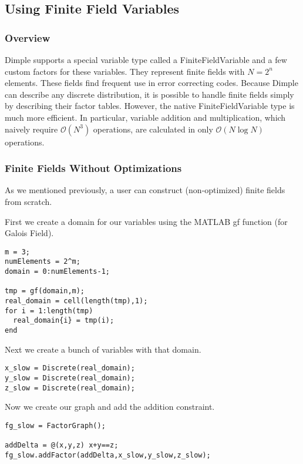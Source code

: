 \subsection{Using Finite Field Variables}
\label{sec:finiteFields}


\subsubsection{Overview}

Dimple supports a special variable type called a FiniteFieldVariable and a few custom factors for these variables. They represent finite fields with $N=2^{n}$ elements. These fields find frequent use in error correcting codes. Because Dimple can describe any discrete distribution, it is possible to handle finite fields simply by describing their factor tables. However, the native FiniteFieldVariable type is much more efficient. In particular, variable addition and multiplication, which naively require $\mathcal{O}(N^{3})$ operations, are calculated in only $\mathcal{O}(N\log N)$ operations.

\ifmatlab

\subsubsection{Finite Fields Without Optimizations}

As we mentioned previously, a user can construct (non-optimized) finite fields from scratch.

First we create a domain for our variables using the MATLAB gf function (for Galois Field).

\begin{lstlisting}
m = 3; 
numElements = 2^m;
domain = 0:numElements-1;

tmp = gf(domain,m); 
real_domain = cell(length(tmp),1);
for i = 1:length(tmp)
  real_domain{i} = tmp(i); 
end
\end{lstlisting}

Next we create a bunch of variables with that domain.

\begin{lstlisting}
x_slow = Discrete(real_domain);
y_slow = Discrete(real_domain); 
z_slow = Discrete(real_domain);
\end{lstlisting}

Now we create our graph and add the addition constraint.

\begin{lstlisting}
fg_slow = FactorGraph();

addDelta = @(x,y,z) x+y==z;
fg_slow.addFactor(addDelta,x_slow,y_slow,z_slow);
\end{lstlisting}

